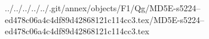 ../../../../../.git/annex/objects/F1/Qg/MD5E-s5224--ed478c06a4c4df89d42868121c114cc3.tex/MD5E-s5224--ed478c06a4c4df89d42868121c114cc3.tex